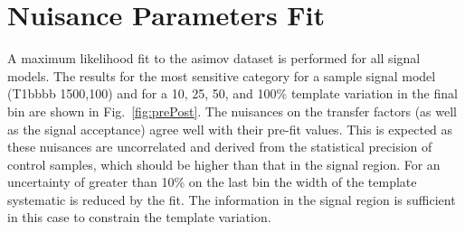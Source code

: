 \clearpage
\section{Nuisance Parameters Fit\label{app:prePostFit}}

A maximum likelihood fit to the asimov dataset is performed for all signal models. 
The results for the most sensitive category for a sample signal model (T1bbbb 1500,100) and for 
a 10, 25, 50, and 100\% template variation in the final bin are shown in Fig.~\ref{fig:prePost}. 
The nuisances on the transfer factors (as well as the signal acceptance) agree 
well with their pre-fit values. This is expected as these nuisances are uncorrelated 
and derived from the statistical precision of control samples, which should be
higher than that in the signal region. For an uncertainty of greater than 10\%
on the last bin the width of the template systematic is reduced by the fit.
The information in the signal region is sufficient in this case
to constrain the template variation. 

